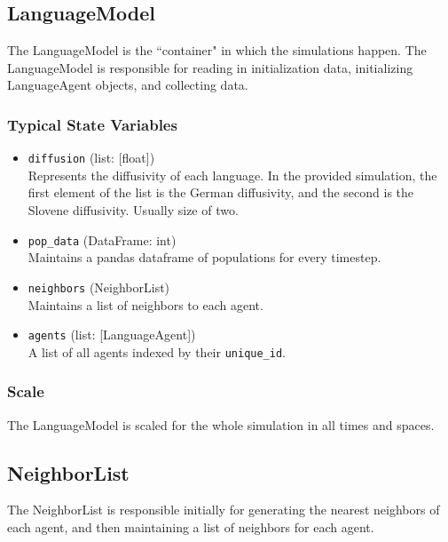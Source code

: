 \documentclass{article}
\begin{document}
\subsection{LanguageModel}
The LanguageModel is the ``container" in which the simulations happen. The LanguageModel is responsible for reading in initialization data, initializing LanguageAgent objects, and collecting data.

\subsubsection{Typical State Variables}
\begin{itemize}
\item \texttt{diffusion} (list: [float]) \\
Represents the diffusivity of each language. In the provided simulation, the first element of the list is the German diffusivity, and the second is the Slovene diffusivity. Usually size of two.

\item \texttt{pop\_data} (DataFrame: int) \\
Maintains a pandas dataframe of populations for every timestep.

\item \texttt{neighbors} (NeighborList) \\
Maintains a list of neighbors to each agent.

\item \texttt{agents} (list: [LanguageAgent]) \\
A list of all agents indexed by their \texttt{unique\_id}.

\end{itemize}

\subsubsection{Scale}
The LanguageModel is scaled for the whole simulation in all times and spaces.

\subsection{NeighborList}
The NeighborList is responsible initially for generating the nearest neighbors of each agent, and then maintaining a list of neighbors for each agent.
\end{document}
